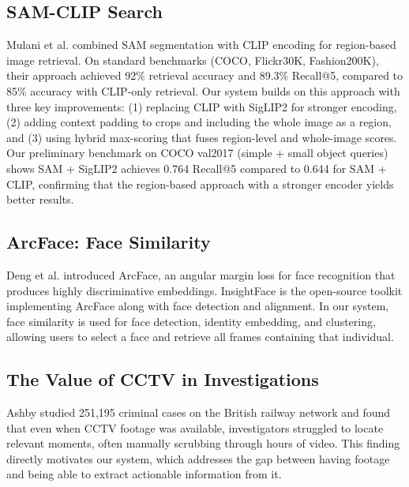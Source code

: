 \subsection{SAM-CLIP Search}

Mulani et al. \cite{mulani2025samclip} combined SAM segmentation with CLIP encoding for region-based image retrieval. On standard benchmarks (COCO, Flickr30K, Fashion200K), their approach achieved 92\% retrieval accuracy and 89.3\% Recall@5, compared to 85\% accuracy with CLIP-only retrieval. Our system builds on this approach with three key improvements: (1) replacing CLIP with SigLIP2 for stronger encoding, (2) adding context padding to crops and including the whole image as a region, and (3) using hybrid max-scoring that fuses region-level and whole-image scores. Our preliminary benchmark on COCO val2017 (simple + small object queries) shows SAM + SigLIP2 achieves 0.764 Recall@5 compared to 0.644 for SAM + CLIP, confirming that the region-based approach with a stronger encoder yields better results.

\subsection{ArcFace: Face Similarity}

Deng et al. \cite{deng2019arcface} introduced ArcFace, an angular margin loss for face recognition that produces highly discriminative embeddings. InsightFace is the open-source toolkit implementing ArcFace along with face detection and alignment. In our system, face similarity is used for face detection, identity embedding, and clustering, allowing users to select a face and retrieve all frames containing that individual.

\subsection{The Value of CCTV in Investigations}

Ashby \cite{ashby2017value} studied 251,195 criminal cases on the British railway network and found that even when CCTV footage was available, investigators struggled to locate relevant moments, often manually scrubbing through hours of video. This finding directly motivates our system, which addresses the gap between having footage and being able to extract actionable information from it.

